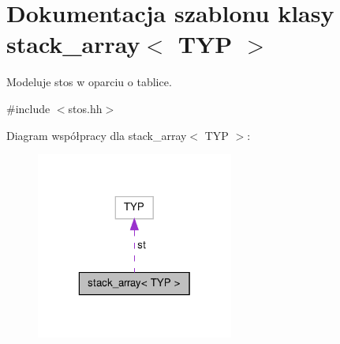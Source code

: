 \hypertarget{classstack__array}{\section{\-Dokumentacja szablonu klasy stack\-\_\-array$<$ \-T\-Y\-P $>$}
\label{classstack__array}
}


\-Modeluje stos w oparciu o tablice.  




{\ttfamily \#include $<$stos.\-hh$>$}



\-Diagram współpracy dla stack\-\_\-array$<$ \-T\-Y\-P $>$\-:\nopagebreak
\begin{figure}[H]
\begin{center}
\leavevmode
\includegraphics[width=184pt]{classstack__array__coll__graph}
\end{center}
\end{figure}
